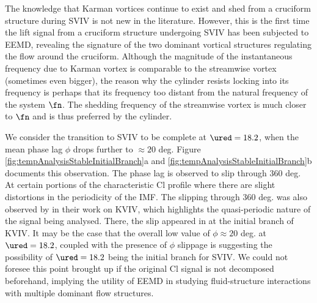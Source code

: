 \documentclass[a4paper,fleqn]{cas-sc}
\begin{document}
The knowledge that Karman vortices continue to exist and shed from a cruciform structure during SVIV is not new in the literature. However, this is the first time the lift signal from a cruciform structure undergoing SVIV has been subjected to EEMD, revealing the signature of the two dominant vortical structures regulating the flow around the cruciform. Although the magnitude of the instantaneous frequency due to Karman vortex is comparable to the streamwise vortex (sometimes even bigger), the reason why the cylinder resists locking into its frequency is perhaps that its frequency too distant from the natural frequency of the system $\fn$. The shedding frequency of the streamwise vortex is much closer to $\fn$ and is thus preferred by the cylinder.

We consider the transition to SVIV to be complete at $\ured = 18.2$, when the mean phase lag $\phi$ drops further to $\approx 20$ deg. Figure \ref{fig:tempAnalysisStableInitialBranch}a and \ref{fig:tempAnalysisStableInitialBranch}b documents this observation. The phase lag is observed to slip through 360 deg. At certain portions of the characteristic Cl profile where there are slight distortions in the periodicity of the IMF. The slipping through 360 deg. was also observed by \citet{Khalak1999} in their work on KVIV, which highlights the quasi-periodic nature of the signal being analysed. There, the slip appeared in \citet{Khalak1999} at the initial branch of KVIV. It may be the case that the overall low value of $\phi \approx 20$ deg. at $\ured = 18.2$, coupled with the presence of $\phi$ slippage is suggesting the possibility of $\ured = 18.2$ being the initial branch for SVIV. We could not foresee this point brought up if the original Cl signal is not decomposed beforehand, implying the utility of EEMD in studying fluid-structure interactions with multiple dominant flow structures.
\end{document}
